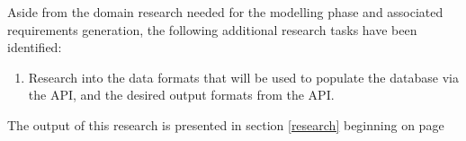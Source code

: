Aside from the domain research needed for the modelling phase and associated
requirements generation, the following additional research tasks have been
identified:
\begin{enumerate}
  \item Research into the data formats that will be used to populate the
  database via the API, and the desired output formats from the API.
\end{enumerate}
The output of this research is presented in section \ref{research} beginning on
page
\pageref{research}
